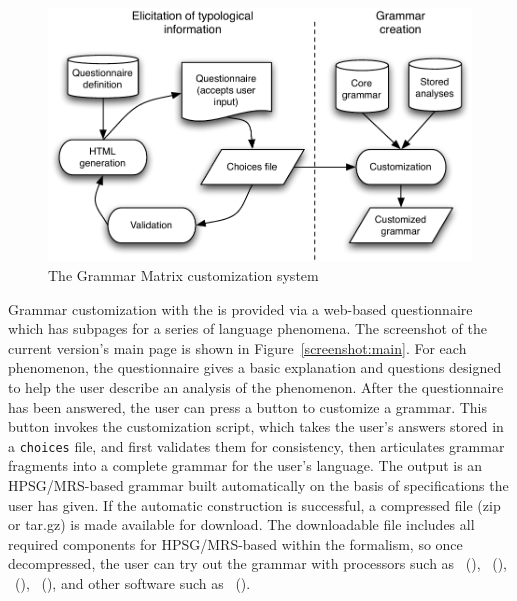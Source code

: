 \begin{figure} 
\begin{center} 
\includegraphics[width=.9\textwidth]{pdf/schema.pdf}
\caption{The \lingo Grammar Matrix customization system}
\label{fig:schema}
\end{center}
\end{figure}




\largerpage
Grammar customization with the \lingo {} is provided
via a web-based questionnaire which has subpages for a series of
language phenomena.  The screenshot of the current version's main page
is shown in Figure~\ref{screenshot:main}.  For each phenomenon, the
questionnaire gives a basic explanation and questions designed to help
the user describe an analysis of the phenomenon.  After the
questionnaire has been answered, the user can press a button to
customize a grammar.  This button invokes the customization script,
which takes the user's answers stored in a \texttt{choices} file, and
first validates them for consistency, then articulates grammar
fragments into a complete grammar for the user's
language. The output is an HPSG/MRS-based grammar
built automatically on the basis of specifications the user has
given. If the automatic construction is successful, a compressed file
(zip or tar.gz) is made available for download. The downloadable file
includes all required components for HPSG/MRS-based  within the  formalism, so once
decompressed, the user can try out the grammar with processors such as
\isi{\lkb}~(\citealt{copestake:02}),
\isi{\pet}~(\citealt{callmeier:00}),
\isi{\agree}~(\citealt{slayden:12}),
\isi{\ace}~(), and other
 software such as \isi{\itsdb}~(\citealt{oepen:01}).


